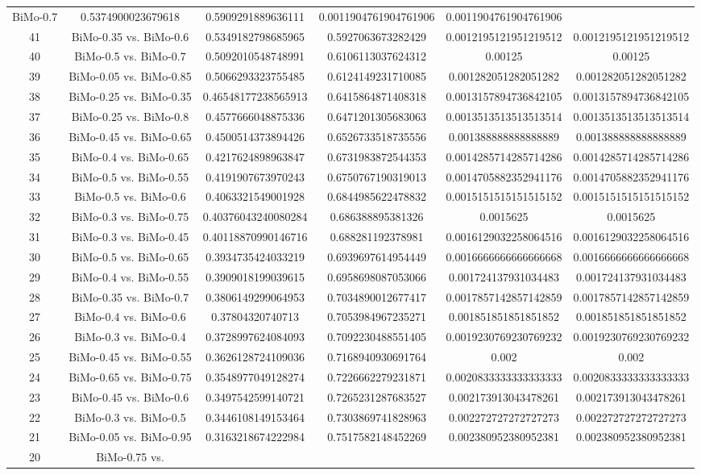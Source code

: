 \documentclass[a4paper,10pt]{article}
\begin{document}
\begin{landscape}
\begin{table}[!htp]
\begin{tabular}{cccccc}
BiMo-0.7&0.5374900023679618&0.5909291889636111&0.0011904761904761906&0.0011904761904761906\\41&BiMo-0.35 vs. BiMo-0.6&0.5349182798685965&0.5927063673282429&0.0012195121951219512&0.0012195121951219512\\40&BiMo-0.5 vs. BiMo-0.7&0.5092010548748991&0.6106113037624312&0.00125&0.00125\\39&BiMo-0.05 vs. BiMo-0.85&0.5066293323755485&0.6124149231710085&0.001282051282051282&0.001282051282051282\\38&BiMo-0.25 vs. BiMo-0.35&0.46548177238565913&0.6415864871408318&0.0013157894736842105&0.0013157894736842105\\37&BiMo-0.25 vs. BiMo-0.8&0.4577666048875336&0.6471201305683063&0.0013513513513513514&0.0013513513513513514\\36&BiMo-0.45 vs. BiMo-0.65&0.4500514373894426&0.6526733518735556&0.001388888888888889&0.001388888888888889\\35&BiMo-0.4 vs. BiMo-0.65&0.4217624898963847&0.6731983872544353&0.0014285714285714286&0.0014285714285714286\\34&BiMo-0.5 vs. BiMo-0.55&0.4191907673970243&0.6750767190319013&0.0014705882352941176&0.0014705882352941176\\33&BiMo-0.5 vs. BiMo-0.6&0.4063321549001928&0.6844985622478832&0.0015151515151515152&0.0015151515151515152\\32&BiMo-0.3 vs. BiMo-0.75&0.40376043240080284&0.686388895381326&0.0015625&0.0015625\\31&BiMo-0.3 vs. BiMo-0.45&0.40118870990146716&0.688281192378981&0.0016129032258064516&0.0016129032258064516\\30&BiMo-0.5 vs. BiMo-0.65&0.3934735424033219&0.6939697614954449&0.0016666666666666668&0.0016666666666666668\\29&BiMo-0.4 vs. BiMo-0.55&0.3909018199039615&0.6958698087053066&0.001724137931034483&0.001724137931034483\\28&BiMo-0.35 vs. BiMo-0.7&0.3806149299064953&0.7034890012677417&0.0017857142857142859&0.0017857142857142859\\27&BiMo-0.4 vs. BiMo-0.6&0.37804320740713&0.7053984967235271&0.001851851851851852&0.001851851851851852\\26&BiMo-0.3 vs. BiMo-0.4&0.3728997624084093&0.7092230488551405&0.0019230769230769232&0.0019230769230769232\\25&BiMo-0.45 vs. BiMo-0.55&0.3626128724109036&0.7168940930691764&0.002&0.002\\24&BiMo-0.65 vs. BiMo-0.75&0.3548977049128274&0.7226662279231871&0.0020833333333333333&0.0020833333333333333\\23&BiMo-0.45 vs. BiMo-0.6&0.3497542599140721&0.7265231287683527&0.002173913043478261&0.002173913043478261\\22&BiMo-0.3 vs. BiMo-0.5&0.3446108149153464&0.7303869741828963&0.002272727272727273&0.002272727272727273\\21&BiMo-0.05 vs. BiMo-0.95&0.3163218674222984&0.7517582148452269&0.002380952380952381&0.002380952380952381\\20&BiMo-0.75 vs. 
\end{tabular}
\end{table}
\end{landscape}
\end{document}

